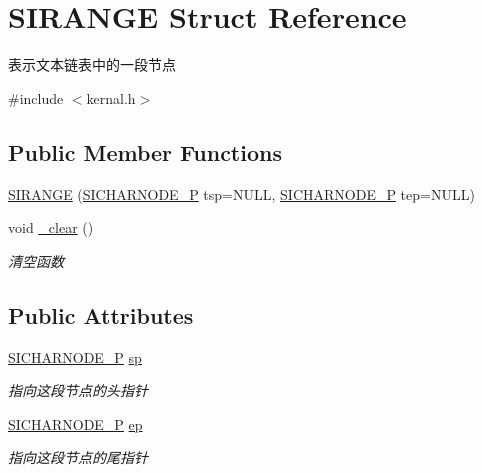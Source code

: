 \hypertarget{struct_s_i_r_a_n_g_e}{}\section{S\+I\+R\+A\+N\+GE Struct Reference}
\label{struct_s_i_r_a_n_g_e}


表示文本链表中的一段节点  




{\ttfamily \#include $<$kernal.\+h$>$}

\subsection*{Public Member Functions}
\begin{DoxyCompactItemize}
\item 
\hyperlink{struct_s_i_r_a_n_g_e_a7c9322d5aec16acda0c4b95a9d48891a}{S\+I\+R\+A\+N\+GE} (\hyperlink{class_s_i_c_h_a_r_n_o_d_e}{S\+I\+C\+H\+A\+R\+N\+O\+D\+E\+\_\+P} tsp=N\+U\+LL, \hyperlink{class_s_i_c_h_a_r_n_o_d_e}{S\+I\+C\+H\+A\+R\+N\+O\+D\+E\+\_\+P} tep=N\+U\+LL)
\item 
void \hyperlink{struct_s_i_r_a_n_g_e_afa57adc9093ce9213bedf4bb4c74310a}{\+\_\+clear} ()
\begin{DoxyCompactList}\small\item\em 清空函数~\newline
\end{DoxyCompactList}\end{DoxyCompactItemize}
\subsection*{Public Attributes}
\begin{DoxyCompactItemize}
\item 
\hyperlink{class_s_i_c_h_a_r_n_o_d_e}{S\+I\+C\+H\+A\+R\+N\+O\+D\+E\+\_\+P} \hyperlink{struct_s_i_r_a_n_g_e_a7acdf296d873d6ed6fc203674109b715}{sp}
\begin{DoxyCompactList}\small\item\em 指向这段节点的头指针 \end{DoxyCompactList}\item 
\hyperlink{class_s_i_c_h_a_r_n_o_d_e}{S\+I\+C\+H\+A\+R\+N\+O\+D\+E\+\_\+P} \hyperlink{struct_s_i_r_a_n_g_e_aaa89b5ae16be7b890eba048bc212feec}{ep}
\begin{DoxyCompactList}\small\item\em 指向这段节点的尾指针 \end{DoxyCompactList}\end{DoxyCompactItemize}


